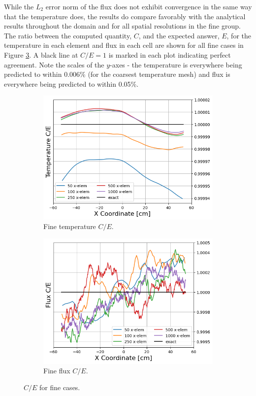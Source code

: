 \documentclass[letterpaper]{mc2023}
\begin{document}
While the $L_2$ error norm of the flux does not exhibit convergence in the same way that the temperature does, the results do compare favorably
with the analytical results throughout the domain and for all spatial resolutions in the fine group. The ratio between the computed quantity,
$C$, and the expected answer, $E$, for the temperature in each element and flux in each cell are shown for all fine cases in Figure \ref{fig:fine_ce}.
A black line at $C/E = 1$ is marked in each plot indicating perfect agreement. Note the scales of the $y$-axes - the temperature is everywhere
being predicted to within 0.006\% (for the coarsest temperature mesh) and flux is everywhere being predicted to within 0.05\%.
\begin{figure}[H]
    \centering
    \begin{subfigure}{0.475\linewidth}
        \includegraphics[width=\linewidth]{figures/fine_temp_num_to_analy_ratios.png}
        \caption{Fine temperature $C/E$.}
        \label{fig:fine_temp_ce}
    \end{subfigure}
    \begin{subfigure}{0.475\linewidth}
        \includegraphics[width=\linewidth]{figures/fine_flux_num_to_analy_ratios.png}
        \caption{Fine flux $C/E$.}
        \label{fig:fine_flux_ce}
    \end{subfigure}
    \par\bigskip
    \caption{$C/E$ for fine cases.}
    \label{fig:fine_ce}
\end{figure}
\end{document}

